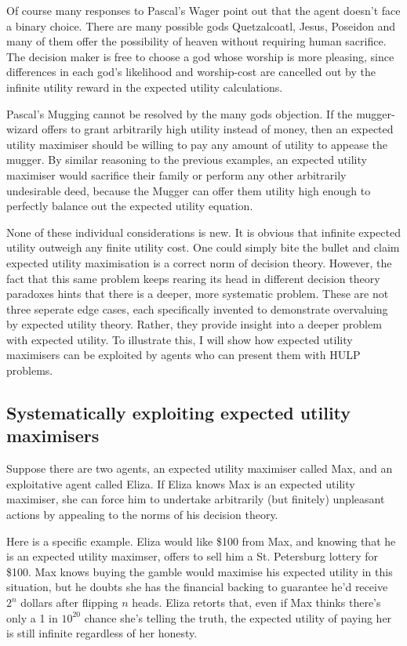 \documentclass{article}
\begin{document}
Of course many responses \citep{mackie1990miracle, diderot1746pensees} to Pascal's Wager point out that the agent doesn't face a binary choice. There are many possible gods\textemdash{} Quetzalcoatl, Jesus, Poseidon\textemdash{} and many of them offer the possibility of heaven without requiring human sacrifice. The decision maker is free to choose a god whose worship is more pleasing, since differences in each god's likelihood and worship-cost are cancelled out by the infinite utility reward in the expected utility calculations.

Pascal's Mugging cannot be resolved by the many gods objection. If the mugger-wizard offers to grant arbitrarily high utility instead of money, then an expected utility maximiser should be willing to pay any amount of utility to appease the mugger. By similar reasoning to the previous examples, an expected utility maximiser would sacrifice their family or perform any other arbitrarily undesirable deed, because the Mugger can offer them utility high enough to perfectly balance out the expected utility equation.

None of these individual considerations is new. It is obvious that infinite expected utility outweigh any finite utility cost. One could simply bite the bullet and claim expected utility maximisation is a correct norm of decision theory. However, the fact that this same problem keeps rearing its head in different decision theory paradoxes hints that there is a deeper, more systematic problem. These are not three seperate edge cases, each specifically invented to demonstrate overvaluing by expected utility theory. Rather, they provide insight into a deeper problem with expected utility. To illustrate this, I will show how expected utility maximisers can be exploited by agents who can present them with HULP problems.

\subsection{Systematically exploiting expected utility maximisers}

Suppose there are two agents, an expected utility maximiser called Max, and an exploitative agent called Eliza. If Eliza knows Max is an expected utility maximiser, she can force him to undertake arbitrarily (but finitely) unpleasant actions by appealing to the norms of his decision theory. 

Here is a specific example. Eliza would like \$100 from Max, and knowing that he is an expected utility maximser, offers to sell him a St. Petersburg lottery for \$100. Max knows buying the gamble would maximise his expected utility in this situation, but he doubts she has the financial backing to guarantee he'd receive \(2^n\) dollars after flipping \(n\) heads. Eliza retorts that, even if Max thinks there's only a 1 in \(10^{20}\) chance she's telling the truth, the expected utility of paying her is still infinite regardless of her honesty.
\end{document}
